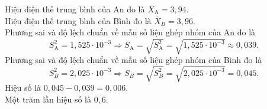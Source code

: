 \begin{bt}
{\begin{center}
\begin{tabular}{|c|c|c|c|c|}
				\hline
			\end{tabular}
		\end{center}		
		Hiệu điện thế trung bình của An đo là  $\overline{X}_{\mathrm{A}}=3{,}94$.\\		
		Hiệu điện thế trung bình của Bình đo là  $\overline{X}_{B}=3{,}96$.\\		
		Phương sai và độ lệch chuẩn về mẫu số liệu ghép nhóm của An đo là 
		$$S_{\mathrm{A}}^{2}=1{,}525 \cdot 10^{-3} \Rightarrow S_{\mathrm{A}}=\sqrt{S_{\mathrm{A}}^{2}}=\sqrt{1{,}525 \cdot 10^{-3}} \approx 0{,}039.$$
		Phương sai và độ lệch chuẩn về mẫu số liệu ghép nhóm của Bình đo là
		$$S_{B}^{2}=2{,}025 \cdot 10^{-3} \Rightarrow S_{B}=\sqrt{S_{B}^{2}}=\sqrt{2{,}025 \cdot 10^{-3}}=0{,}045.$$
		Hiệu số là $0{,}045-0{,}039=0{,}006$.\\
		Một trăm lần hiệu số là $0{,}6$.
	}
\end{bt}

